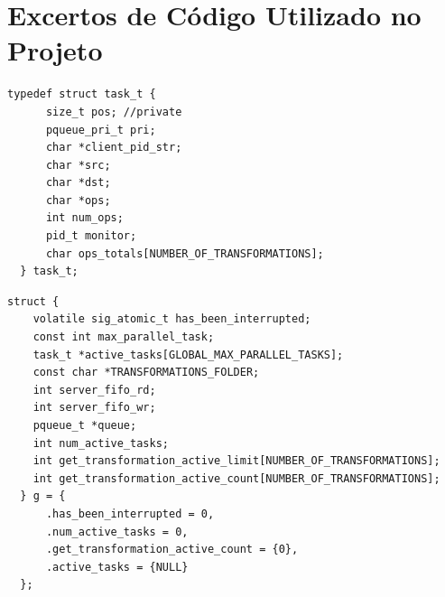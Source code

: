 \documentclass[11pt,a4paper]{report}%
\begin{document}
\appendix %
\chapter{Excertos de Código Utilizado no Projeto}


\label{code:task_struct}
\begin{lstlisting}[caption={Estrutura para pedidos de processamento de ficheiros}]
    typedef struct task_t {
      size_t pos; //private
      pqueue_pri_t pri;
      char *client_pid_str;
      char *src;
      char *dst;
      char *ops;
      int num_ops;
      pid_t monitor;
      char ops_totals[NUMBER_OF_TRANSFORMATIONS];
  } task_t;
\end{lstlisting}

\label{code:server_struct}
\begin{lstlisting}[caption={Amostra de Estrutura global do servidor}]
  struct {
    volatile sig_atomic_t has_been_interrupted;
    const int max_parallel_task;
    task_t *active_tasks[GLOBAL_MAX_PARALLEL_TASKS];
    const char *TRANSFORMATIONS_FOLDER;
    int server_fifo_rd;
    int server_fifo_wr;
    pqueue_t *queue;
    int num_active_tasks;
    int get_transformation_active_limit[NUMBER_OF_TRANSFORMATIONS];
    int get_transformation_active_count[NUMBER_OF_TRANSFORMATIONS];
  } g = {
      .has_been_interrupted = 0,
      .num_active_tasks = 0,
      .get_transformation_active_count = {0},
      .active_tasks = {NULL}
  };
\end{lstlisting}

\newpage



\end{document}
